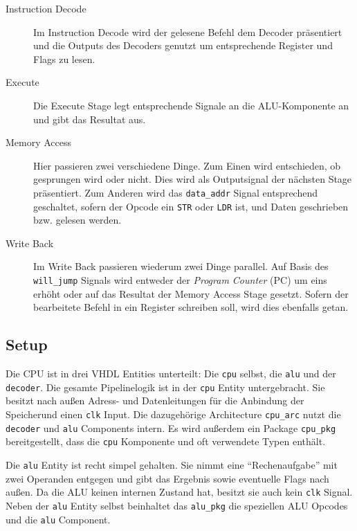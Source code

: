 \documentclass[paper=a4,fontsize=11pt,twocolumn]{scrreprt}
\begin{document}
\begin{description}
  \item[Instruction Decode]
  Im Instruction Decode wird der gelesene Befehl dem Decoder präsentiert und die Outputs des Decoders genutzt um entsprechende Register und Flags zu lesen.
  \item[Execute]
  Die Execute Stage legt entsprechende Signale an die ALU-Komponente an und gibt das Resultat aus.
  \item[Memory Access]
  Hier passieren zwei verschiedene Dinge.
  Zum Einen wird entschieden, ob gesprungen wird oder nicht.
  Dies wird als Outputsignal der nächsten Stage präsentiert.
  Zum Anderen wird das \texttt{data\_addr} Signal entsprechend geschaltet, sofern der Opcode ein \texttt{STR} oder \texttt{LDR} ist, und Daten geschrieben bzw. gelesen werden.
  \item[Write Back]
  Im Write Back passieren wiederum zwei Dinge parallel.
  Auf Basis des \texttt{will\_jump} Signals wird entweder der \textit{Program Counter} (PC) um eins erhöht oder auf das Resultat der Memory Access Stage gesetzt.
  Sofern der bearbeitete Befehl in ein Register schreiben soll, wird dies ebenfalls getan.
\end{description}

\subsection{Setup}
\label{subsec:setup}

Die CPU ist in drei VHDL Entities unterteilt: Die \texttt{cpu} selbst, die \texttt{alu} und der \texttt{decoder}.
Die gesamte Pipelinelogik ist in der \texttt{cpu} Entity untergebracht.
Sie besitzt nach außen Adress- und Datenleitungen für die Anbindung der Speicher\footnotemark und einen \texttt{clk} Input.
Die dazugehörige Architecture \texttt{cpu\_arc} nutzt die \texttt{decoder} und \texttt{alu} Components intern.
Es wird außerdem ein Package \texttt{cpu\_pkg} bereitgestellt, dass die \texttt{cpu} Komponente und oft verwendete Typen enthält.

Die \texttt{alu} Entity ist recht simpel gehalten.
Sie nimmt eine \enquote{Rechenaufgabe} mit zwei Operanden entgegen und gibt das Ergebnis sowie eventuelle Flags nach außen.
Da die ALU keinen internen Zustand hat, besitzt sie auch kein \texttt{clk} Signal.
Neben der \texttt{alu} Entity selbst beinhaltet das \texttt{alu\_pkg} die speziellen ALU Opcodes und die \texttt{alu} Component.
\end{document}
